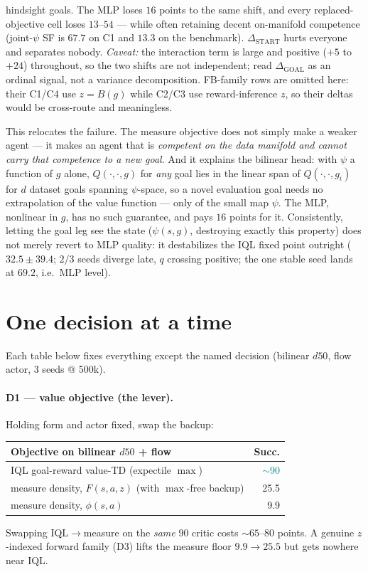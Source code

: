 \documentclass[11pt]{article}
\newcommand{\good}[1]{\textcolor{teal}{#1}}
\newcommand{\bad}[1]{\textcolor{red!70!black}{#1}}
\begin{document}
\begin{table}[h]
{hindsight goals. The MLP loses $16$ points to the same shift, and every replaced-objective
cell loses $13$--$54$ --- while often retaining decent on-manifold competence (joint-$\psi$ SF
is $67.7$ on C1 and $13.3$ on the benchmark). $\Delta_{\text{START}}$ hurts everyone and
separates nobody. \emph{Caveat:} the interaction term is large and positive
($+5$ to $+24$) throughout, so the two shifts are not independent; read
$\Delta_{\text{GOAL}}$ as an ordinal signal, not a variance decomposition. FB-family rows are
omitted here: their C1/C4 use $z{=}B(g)$ while C2/C3 use reward-inference $z$, so their
deltas would be cross-route and meaningless.}
\label{tab:ood}
\end{table}

\noindent This relocates the failure. The measure objective does not simply make a weaker
agent --- it makes an agent that is \emph{competent on the data manifold and cannot carry that
competence to a new goal}. And it explains the bilinear head: with $\psi$ a function of $g$
alone, $Q(\cdot,\cdot,g)$ for \emph{any} goal lies in the linear span of $Q(\cdot,\cdot,g_i)$
for $d$ dataset goals spanning $\psi$-space, so a novel evaluation goal needs no
extrapolation of the value function --- only of the small map $\psi$. The MLP, nonlinear in
$g$, has no such guarantee, and pays $16$ points for it. Consistently, letting the goal leg
see the state ($\psi(s,g)$, destroying exactly this property) does not merely revert to MLP
quality: it destabilizes the IQL fixed point outright ($32.5\pm39.4$; $2/3$ seeds diverge
late, $q$ crossing positive; the one stable seed lands at $69.2$, i.e.\ MLP level).

\section{One decision at a time}
\label{sec:isolations}
Each table below fixes everything except the named decision (bilinear $d50$, flow
actor, 3 seeds @ 500k).

\paragraph{D1 --- value objective (the lever).}
Holding form and actor fixed, swap the backup:
\begin{center}\small
\begin{tabular}{@{}l r@{}}
\toprule
Objective on bilinear $d50$ + flow & Succ. \\
\midrule
IQL goal-reward value-TD (expectile $\max$) & \good{$\sim$90} \\
measure density, $F(s,a,z)$ (with $\max$-free backup) & 25.5 \\
measure density, $\phi(s,a)$ & \bad{9.9} \\
\bottomrule
\end{tabular}
\end{center}
Swapping IQL$\to$measure on the \emph{same} $90$ critic costs $\sim65$--$80$ points.
A genuine $z$-indexed forward family (D3) lifts the measure floor $9.9{\to}25.5$ but
gets nowhere near IQL.
\end{document}
